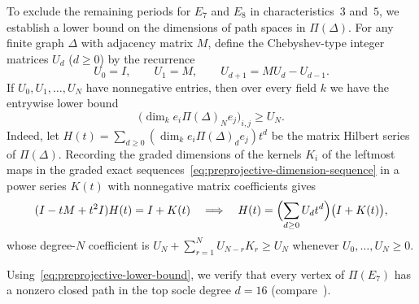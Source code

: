 To exclude the remaining periods for $E_7$ and $E_8$ in characteristics~$3$ and~$5$, we establish a lower bound on the dimensions of path spaces in $\Pi(\Delta)$. For any finite graph $\Delta$ with adjacency matrix $M$, define the Chebyshev-type integer matrices $U_d$ ($d\geq0$) by the recurrence
\[
  U_0=I,\qquad U_1=M,\qquad U_{d+1}=MU_d-U_{d-1}.
\]
If $U_0,U_1,\ldots,U_N$ have nonnegative entries, then over every field $k$ we have the entrywise lower bound
\begin{equation}
  \label{eq:preprojective-lower-bound}
  \bigl(\dim_k e_i\Pi(\Delta)_N e_j\bigr)_{i,j}\geq U_N.
\end{equation}
Indeed, let $H(t)=\sum_{d\geq0}(\dim_k e_i\Pi(\Delta)_d e_j)t^d$ be the matrix Hilbert series of $\Pi(\Delta)$. Recording the graded dimensions of the kernels $K_i$ of the leftmost maps in the graded exact sequences~\eqref{eq:preprojective-dimension-sequence} in a power series $K(t)$ with nonnegative matrix coefficients gives
\[
  (I-tM+t^2I)H(t)=I+K(t)\quad\Longrightarrow\quad
  H(t)=\Bigl(\sum_{d\geq0}U_dt^d\Bigr)\bigl(I+K(t)\bigr),
\]
whose degree-$N$ coefficient is $U_N+\sum_{r=1}^N U_{N-r}K_r\geq U_N$ whenever $U_0,\ldots,U_N\geq0$.

Using~\eqref{eq:preprojective-lower-bound}, we verify that every vertex of $\Pi(E_7)$ has a nonzero closed path in the top socle degree $d=16$ (compare~\cite[Section~6.2]{Kaplan}).

